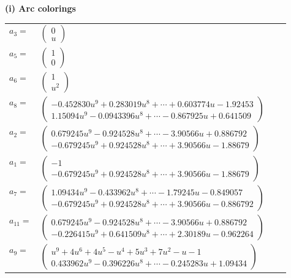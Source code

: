 \documentclass[1p]{elsarticle_modified}
\theoremstyle{definition}
\begin{document}
\flushleft \textbf{(i) Arc colorings}\\
\begin{tabular}{m{7pt} m{180pt} m{7pt} m{180pt} }
\flushright $a_{3}=$&$\begin{pmatrix}0\\u\end{pmatrix}$ \\
\flushright $a_{5}=$&$\begin{pmatrix}1\\0\end{pmatrix}$ \\
\flushright $a_{6}=$&$\begin{pmatrix}1\\u^2\end{pmatrix}$ \\
\flushright $a_{8}=$&$\begin{pmatrix}-0.452830 u^{9}+0.283019 u^{8}+\cdots+0.603774 u-1.92453\\1.15094 u^{9}-0.0943396 u^{8}+\cdots-0.867925 u+0.641509\end{pmatrix}$ \\
\flushright $a_{2}=$&$\begin{pmatrix}0.679245 u^{9}-0.924528 u^{8}+\cdots-3.90566 u+0.886792\\-0.679245 u^{9}+0.924528 u^{8}+\cdots+3.90566 u-1.88679\end{pmatrix}$ \\
\flushright $a_{1}=$&$\begin{pmatrix}-1\\-0.679245 u^{9}+0.924528 u^{8}+\cdots+3.90566 u-1.88679\end{pmatrix}$ \\
\flushright $a_{7}=$&$\begin{pmatrix}1.09434 u^{9}-0.433962 u^{8}+\cdots-1.79245 u-0.849057\\-0.679245 u^{9}+0.924528 u^{8}+\cdots+3.90566 u-0.886792\end{pmatrix}$ \\
\flushright $a_{11}=$&$\begin{pmatrix}0.679245 u^{9}-0.924528 u^{8}+\cdots-3.90566 u+0.886792\\-0.226415 u^{9}+0.641509 u^{8}+\cdots+2.30189 u-0.962264\end{pmatrix}$ \\
\flushright $a_{9}=$&$\begin{pmatrix}u^9+4 u^6+4 u^5- u^4+5 u^3+7 u^2- u-1\\0.433962 u^{9}-0.396226 u^{8}+\cdots-0.245283 u+1.09434\end{pmatrix}$ \\

\end{tabular}
\end{document}
